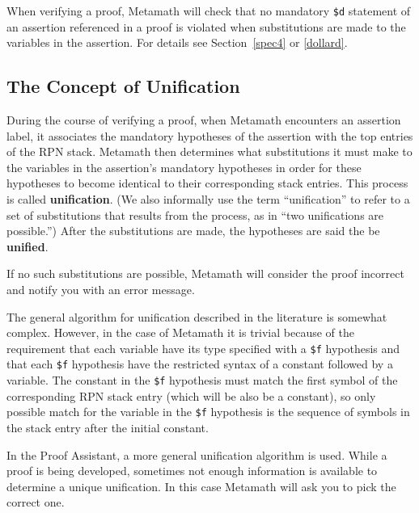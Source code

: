 When verifying a proof, Metamath will check that no mandatory
\texttt{\$d} statement of an assertion referenced in a proof is violated
when substitutions are made to the variables in the assertion.  For details
see Section~\ref{spec4} or \ref{dollard}.

\subsection{The Concept of Unification} \label{unify}

During the course of verifying a proof, when Metamath
encounters an assertion label, it associates the
mandatory hypotheses of the assertion with the top
entries of the RPN stack.  Metamath then
determines what substitutions it must make to the variables in the assertion's mandatory
hypotheses in order for these hypotheses to become identical to their
corresponding stack entries.  This process is called {\bf
unification}.  (We also informally use the term
``unification'' to refer to a set of substitutions that results from the
process, as in ``two unifications are possible.'')  After the substitutions
are made, the hypotheses are said the be {\bf unified}.

If no such substitutions are possible, Metamath will consider the proof
incorrect and notify you with an error message.

The general algorithm for unification described in the literature is
somewhat complex.  However, in the case of Metamath it is trivial
because of the requirement that each variable have its type specified
with a \texttt{\$f} hypothesis and that each \texttt{\$f} hypothesis
have the restricted syntax of a constant followed by a variable.  The
constant in the \texttt{\$f} hypothesis must match the first symbol of
the corresponding RPN stack entry (which will be also be a constant), so
only possible match for the variable in the \texttt{\$f} hypothesis is
the sequence of symbols in the stack entry after the initial constant.

In the Proof Assistant, a more general unification
algorithm is used.  While a proof is being developed, sometimes not enough
information is available to determine a unique unification.  In this case
Metamath will ask you to pick the correct one.

